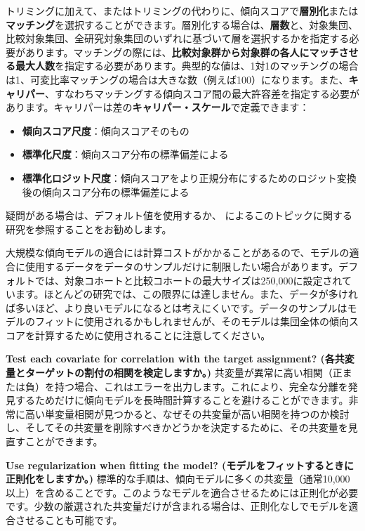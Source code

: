 \documentclass[
  11pt]{book}
\theoremstyle{definition}
\theoremstyle{definition}
\theoremstyle{definition}
\theoremstyle{definition}
\theoremstyle{remark}
\begin{document}
トリミングに加えて、またはトリミングの代わりに、傾向スコアで\textbf{層別化}または\textbf{マッチング}を選択することができます。層別化する場合は、\textbf{層数}と、対象集団、比較対象集団、全研究対象集団のいずれに基づいて層を選択するかを指定する必要があります。マッチングの際には、\textbf{比較対象群から対象群の各人にマッチさせる最大人数}を指定する必要があります。典型的な値は、1対1のマッチングの場合は1、可変比率マッチングの場合は大きな数（例えば100）になります。また、\textbf{キャリパー}、すなわちマッチングする傾向スコア間の最大許容差を指定する必要があります。キャリパーは差の\textbf{キャリパー・スケール}で定義できます：

\begin{itemize}
\item
  \textbf{傾向スコア尺度}：傾向スコアそのもの
\item
  \textbf{標準化尺度}：傾向スコア分布の標準偏差による
\item
  \textbf{標準化ロジット尺度}：傾向スコアをより正規分布にするためのロジット変換後の傾向スコア分布の標準偏差による
\end{itemize}

疑問がある場合は、デフォルト値を使用するか、 \citet{austin_2011} によるこのトピックに関する研究を参照することをお勧めします。

大規模な傾向モデルの適合には計算コストがかかることがあるので、モデルの適合に使用するデータをデータのサンプルだけに制限したい場合があります。デフォルトでは、対象コホートと比較コホートの最大サイズは250,000に設定されています。ほとんどの研究では、この限界には達しません。また、データが多ければ多いほど、より良いモデルになるとは考えにくいです。データのサンプルはモデルのフィットに使用されるかもしれませんが、そのモデルは集団全体の傾向スコアを計算するために使用されることに注意してください。

\textbf{Test each covariate for correlation with the target assignment? (各共変量とターゲットの割付の相関を検定しますか。)} 共変量が異常に高い相関（正または負）を持つ場合、これはエラーを出力します。これにより、完全な分離を発見するためだけに傾向モデルを長時間計算することを避けることができます。非常に高い単変量相関が見つかると、なぜその共変量が高い相関を持つのか検討し、そしてその共変量を削除すべきかどうかを決定するために、その共変量を見直すことができます。

\textbf{Use regularization when fitting the model? (モデルをフィットするときに正則化をしますか。)} 標準的な手順は、傾向モデルに多くの共変量（通常10,000以上）を含めることです。このようなモデルを適合させるためには正則化が必要です。少数の厳選された共変量だけが含まれる場合は、正則化なしでモデルを適合させることも可能です。
\end{document}
